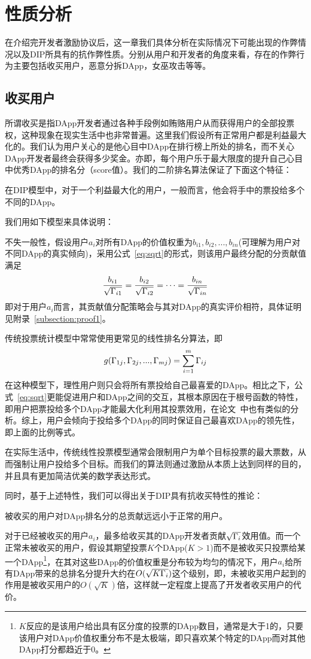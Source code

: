 \section{性质分析}
\label{section:properties}
在介绍完开发者激励协议后，这一章我们具体分析在实际情况下可能出现的作弊情况以及DIP所具有的抗作弊性质。分别从用户和开发者的角度来看，存在的作弊行为主要包括收买用户，恶意分拆DApp，女巫攻击等等。%

\subsection{收买用户}
所谓收买是指DApp开发者通过各种手段例如贿赂用户从而获得用户的全部投票权，这种现象在现实生活中也非常普遍。这里我们假设所有正常用户都是利益最大化的。我们认为用户关心的是他心目中DApp在排行榜上所处的排名，而不关心DApp开发者最终会获得多少奖金。亦即，每个用户乐于最大限度的提升自己心目中优秀DApp的排名分（score值）。我们的二阶排名算法保证了下面这个特征：

\begin{property}
	\label{p1}
	在DIP模型中，对于一个利益最大化的用户，一般而言，他会将手中的票投给多个不同的DApp。
\end{property}
我们用如下模型来具体说明：

不失一般性，假设用户$a_i$对所有DApp的价值权重为$b_{i1},b_{i2},...,b_{in}$(可理解为用户对不同DApp的真实倾向)，采用公式~\ref{eq:sqrt}的形式，则该用户最终分配的分贡献值满足
$$\frac{b_{i1}}{\sqrt{\Gamma_{i1}}}=\frac{b_{i2}}{\sqrt{\Gamma_{i2}}}=\cdots=\frac{b_{in}}{\sqrt{\Gamma_{in}}}$$
即对于用户$a_i$而言，其贡献值分配策略会与其对DApp的真实评价相符，具体证明见附录~\ref{subsection:proof1}。

传统投票统计模型中常常使用更常见的线性排名分算法，即
$$g(\Gamma_{1j},\Gamma_{2j},...,\Gamma_{mj}) = \sum_{i=1}^m \Gamma_{ij}$$
在这种模型下，理性用户则只会将所有票投给自己最喜爱的DApp。相比之下，公式~\ref{eq:sqrt}更能促进用户和DApp之间的交互，其根本原因在于根号函数的特性，即用户把票投给多个DApp才能最大化利用其投票效用，在论文~\cite{buterin2018liberal}中也有类似的分析。综上，用户会倾向于投给多个DApp的同时保证自己最喜欢DApp的领先性，即上面的比例等式。

在实际生活中，传统线性投票模型通常会限制用户为单个目标投票的最大票数，从而强制让用户投给多个目标。而我们的算法则通过激励从本质上达到同样的目的，并且具有更加简洁优美的数学表达形式。

同时，基于上述特性，我们可以得出关于DIP具有抗收买特性的推论：
\begin{corollary}
被收买的用户对DApp排名分的总贡献远远小于正常的用户。
\end{corollary}
对于已经被收买的用户$a_i$，最多给收买其的DApp开发者贡献$\sqrt{\Gamma_i}$效用值。而一个正常未被收买的用户，假设其期望投票$K$个DApp($K>1$)而不是被收买只投票给某一个DApp\footnote{$K$反应的是该用户给出具有区分度的投票的DApp数目，通常是大于1的，只要该用户对DApp价值权重分布不是太极端，即只喜欢某个特定的DApp而对其他DApp打分都趋近于0。}，在其对这些DApp的价值权重是分布较为均匀的情况下，用户$a_i$给所有DApp带来的总排名分提升大约在$O(\sqrt{K\Gamma_i})$这个级别，即，未被收买用户起到的作用是被收买用户的$O(\sqrt{K})$倍，这样就一定程度上提高了开发者收买用户的代价。

